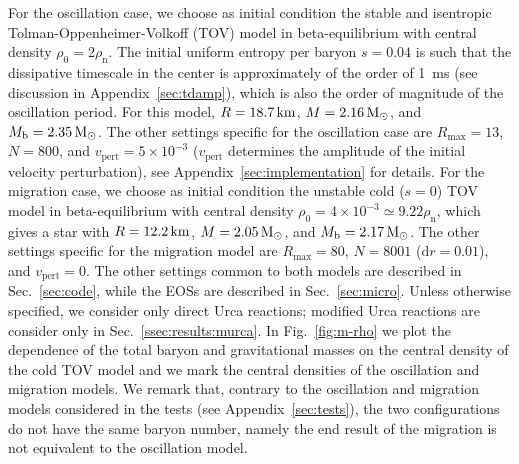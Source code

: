 \documentclass[aps,prd,twocolumn,a4paper,floatfix,nofootbib,superscriptaddress,nofootinbib]{revtex4}
\newcommand{\rn}{\mathrm{n}}
\begin{document}
For the oscillation case, we choose as initial condition the stable and isentropic Tolman-Oppenheimer-Volkoff (TOV)
model in beta-equilibrium with central density $\rho_0=2\rho_\rn$.
%
The initial uniform entropy per baryon $s=0.04$ is such that the dissipative
timescale in the center is approximately of the order of 1~ms (see discussion in
Appendix~\ref{sec:tdamp}),
which is also the order of magnitude of the oscillation period.
%
For this model, $R=\unit[18.7]{km}$, $M=\unit[2.16]{M_\odot}$, and
$M_\mathrm{b}=\unit[2.35]{M_\odot}$.
%
The other settings specific for the oscillation case are $R_\mathrm{max}=13$,
$N=800$, and $v_\mathrm{pert}=5\times10^{-3}$ ($v_\mathrm{pert}$ determines the
amplitude of the initial velocity perturbation), see Appendix~\ref{sec:implementation} for details.
%
For the migration case, we choose as initial condition the unstable cold ($s=0$) TOV
model in beta-equilibrium with central density $\rho_0=4\times10^{-3}\simeq9.22\rho_\rn$, which
gives a star with $R=\unit[12.2]{km}$, $M=\unit[2.05]{M_\odot}$, and
$M_\mathrm{b}=\unit[2.17]{M_\odot}$.
%
The other settings specific for the migration model are $R_\mathrm{max}=80$,
$N= 8001$ ($\mathrm dr=0.01$), and $v_\mathrm{pert}=0$.
%
The other settings common to both models are described in Sec.~\ref{sec:code},
while the EOSs are described in Sec.~\ref{sec:micro}.
%
Unless otherwise specified, we consider only direct Urca reactions; modified
Urca reactions are consider only in Sec.~\ref{ssec:results:murca}.
%
In Fig.~\ref{fig:m-rho} we plot the dependence of the total baryon and gravitational masses
on the central density of the cold TOV model and we mark the central densities of
the oscillation and migration models.
%
We remark that, contrary to the oscillation and migration models considered in the
tests (see Appendix~\ref{sec:tests}), the two configurations do not have the
same baryon number, namely the end result of the migration is not equivalent to
the oscillation model.
\end{document}
